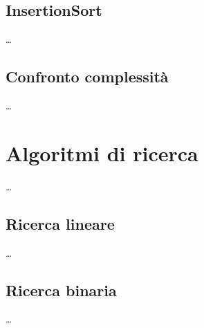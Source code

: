 \documentclass{article}
\begin{document}
\subsection{InsertionSort}
\dots

\subsection{Confronto complessità}
\dots

\section{Algoritmi di ricerca}
\dots

\subsection{Ricerca lineare}
\dots

\subsection{Ricerca binaria}
\dots
\end{document}

